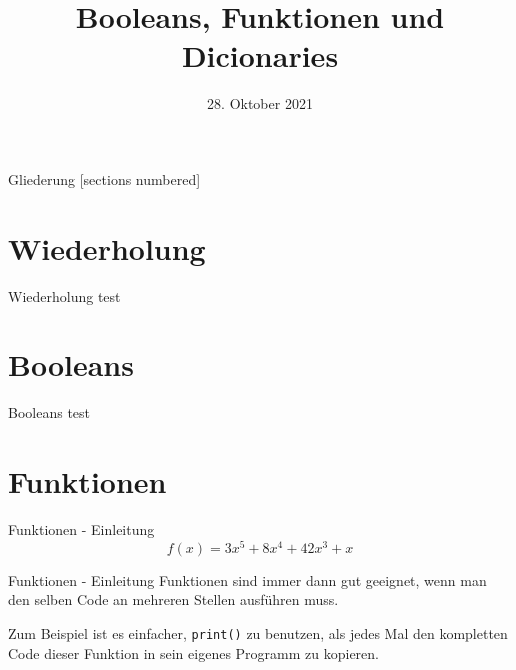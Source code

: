 



\title{Booleans, Funktionen und Dicionaries}
\date{28. Oktober 2021}

\usepackage{graphicx}


	
\maketitle

\begin{frame}{Gliederung}
	[sections numbered]
	\tableofcontents
\end{frame}


\section{Wiederholung}
\begin{frame}{Wiederholung}
	test
\end{frame}

\section{Booleans}
\begin{frame}{Booleans}
	test	
\end{frame}

\section{Funktionen}
\begin{frame}{Funktionen - Einleitung}
		\Large $$ f(x) = 3x^5 + 8x^4 + 42x^3 + x $$
\end{frame}

\begin{frame}{Funktionen - Einleitung}
	Funktionen sind immer dann gut geeignet, wenn man den selben Code an mehreren Stellen ausführen muss.
		
	Zum Beispiel ist es einfacher, \alert{\texttt{print()}} zu benutzen, als jedes Mal den kompletten Code dieser Funktion in sein eigenes Programm zu kopieren.
\end{frame}

